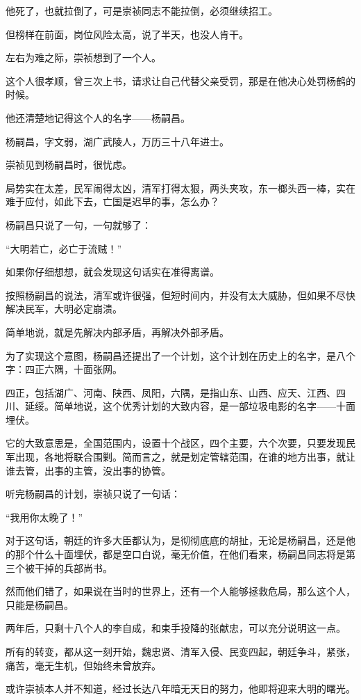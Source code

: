 \begin{multicols}{\theparacolNo}
		他死了，也就拉倒了，可是崇祯同志不能拉倒，必须继续招工。

		但榜样在前面，岗位风险太高，说了半天，也没人肯干。

		左右为难之际，崇祯想到了一个人。

		这个人很孝顺，曾三次上书，请求让自己代替父亲受罚，那是在他决心处罚杨鹤的时候。

		他还清楚地记得这个人的名字——杨嗣昌。

		杨嗣昌，字文弱，湖广武陵人，万历三十八年进士。

		崇祯见到杨嗣昌时，很忧虑。

		局势实在太差，民军闹得太凶，清军打得太狠，两头夹攻，东一榔头西一棒，实在难于应付，如此下去，亡国是迟早的事，怎么办？

		杨嗣昌只说了一句，一句就够了：

		“大明若亡，必亡于流贼！”

		如果你仔细想想，就会发现这句话实在准得离谱。

		按照杨嗣昌的说法，清军或许很强，但短时间内，并没有太大威胁，但如果不尽快解决民军，大明必定崩溃。

		简单地说，就是先解决内部矛盾，再解决外部矛盾。

		为了实现这个意图，杨嗣昌还提出了一个计划，这个计划在历史上的名字，是八个字：四正六隅，十面张网。

		四正，包括湖广、河南、陕西、凤阳，六隅，是指山东、山西、应天、江西、四川、延绥。简单地说，这个优秀计划的大致内容，是一部垃圾电影的名字——十面埋伏。

		它的大致意思是，全国范围内，设置十个战区，四个主要，六个次要，只要发现民军出现，各地将联合围剿。简而言之，就是划定管辖范围，在谁的地方出事，就让谁去管，出事的主管，没出事的协管。

		听完杨嗣昌的计划，崇祯只说了一句话：

		“我用你太晚了！”

		对于这句话，朝廷的许多大臣都认为，是彻彻底底的胡扯，无论是杨嗣昌，还是他的那个什么十面埋伏，都是空口白说，毫无价值，在他们看来，杨嗣昌同志将是第三个被干掉的兵部尚书。

		然而他们错了，如果说在当时的世界上，还有一个人能够拯救危局，那么这个人，只能是杨嗣昌。

		两年后，只剩十八个人的李自成，和束手投降的张献忠，可以充分说明这一点。

		所有的转变，都从这一刻开始，魏忠贤、清军入侵、民变四起，朝廷争斗，紧张，痛苦，毫无生机，但始终未曾放弃。

		或许崇祯本人并不知道，经过长达八年暗无天日的努力，他即将迎来大明的曙光。


\end{multicols}
